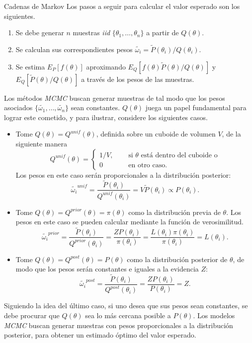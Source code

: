 \documentclass{beamer}
\begin{document}
	\begin{frame}[allowframebreaks]{Cadenas de Markov}
	Los pasos a seguir para calcular el valor esperado son los siguientes.
	\begin{enumerate}
		\item Se debe generar $n$ muestras \textit{iid} $\{\theta_1,\dots,\theta_n\}$ a partir de $Q(\theta)$.
		\item Se calculan sus correspondientes pesos $\tilde{\omega_i}=\tilde{P}(\theta_i)/Q(\theta_i).$
		\item Se estima $E_P[f(\theta)]$ aproximando $E_Q[f(\theta)\tilde{P}(\theta)/Q(\theta)]$ y $E_Q[\tilde{P}(\theta)/Q(\theta)]$ a través de los pesos de las muestras.
	\end{enumerate}
	
	Los métodos \textit{MCMC} buscan generar muestras de tal modo que los pesos asociados $\{\tilde{\omega_1},\dots, \tilde{\omega_n}\}$ sean constantes. $Q(\theta)$ juega un papel fundamental para lograr este cometido, y para ilustrar, considere los siguientes casos.
	
	\begin{itemize}
		\item Tome $Q(\theta)=Q^{unif}(\theta)$, definida sobre un cuboide de volumen $V$, de la siguiente manera
		\[   
Q^{unif}(\theta) = 
     \begin{cases}
		1/V, &\quad\text{ si }\theta\text{ está dentro del cuboide o}\\
		0	&\quad\text{ en otro caso.}
     \end{cases}
\]
Los pesos en este caso serán proporcionales a la distribución posterior:
$$\tilde{\omega_i}^{unif}=\frac{\tilde{P}(\theta_i)}{Q^{unif}(\theta_i)}=V\tilde{P}(\theta_i)\propto P(\theta_i).$$
	\item Tome $Q(\theta)=Q^{prior}(\theta)=\pi(\theta)$ como la distribución previa de $\theta$. Los pesos en este caso se pueden calcular mediante la función de verosimilitud.
	$$\tilde{\omega_i}^{prior}=\frac{\tilde{P}(\theta_i)}{Q^{prior}(\theta_i)}=\frac{ZP(\theta_i)}{\pi(\theta_i)}=\frac{L(\theta_i)\pi(\theta_i)}{\pi(\theta_i)}=L(\theta_i).$$
	\item Tome $Q(\theta)=Q^{post}(\theta)=P(\theta)$ como la distribución posterior de $\theta$, de modo que los pesos serán constantes e iguales a la evidencia $Z$:
	$$\tilde{\omega_i}^{post}=\frac{\tilde{P}(\theta_i)}{Q^{post}(\theta_i)}=\frac{ZP(\theta_i)}{P(\theta_i)}=Z.$$
	\end{itemize}
	Siguiendo la idea del último caso, si uno desea que sus pesos sean constantes, se debe procurar que $Q(\theta)$ sea lo más cercana posible a $P(\theta)$. Los modelos \textit{MCMC} buscan generar muestras con pesos proporcionales a la distribución posterior, para obtener un estimado óptimo del valor esperado.
	

\end{frame}
\end{document}
